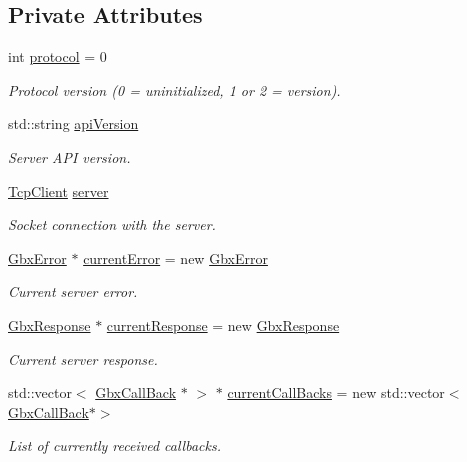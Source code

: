 \subsection*{Private Attributes}
\begin{DoxyCompactItemize}
\item 
int \hyperlink{classGbxRemote_a5ee5c7087085cb6cb2e7bc6135ff0646}{protocol} = 0
\begin{DoxyCompactList}\small\item\em Protocol version (0 = uninitialized, 1 or 2 = version). \end{DoxyCompactList}\item 
std\-::string \hyperlink{classGbxRemote_a81d3c0c70ab7f5e585840e9978ee900e}{api\-Version}
\begin{DoxyCompactList}\small\item\em Server A\-P\-I version. \end{DoxyCompactList}\item 
\hyperlink{classTcpClient}{Tcp\-Client} \hyperlink{classGbxRemote_a0b0b212b945da4266fb645affdac81cb}{server}
\begin{DoxyCompactList}\small\item\em Socket connection with the server. \end{DoxyCompactList}\item 
\hyperlink{structGbxError}{Gbx\-Error} $\ast$ \hyperlink{classGbxRemote_ae5d44c3729140c1eba5e850cb5e5e7bd}{current\-Error} = new \hyperlink{structGbxError}{Gbx\-Error}
\begin{DoxyCompactList}\small\item\em Current server error. \end{DoxyCompactList}\item 
\hyperlink{classGbxResponse}{Gbx\-Response} $\ast$ \hyperlink{classGbxRemote_a3a3a0af1a692a801a33baa292b877dc2}{current\-Response} = new \hyperlink{classGbxResponse}{Gbx\-Response}
\begin{DoxyCompactList}\small\item\em Current server response. \end{DoxyCompactList}\item 
std\-::vector$<$ \hyperlink{classGbxCallBack}{Gbx\-Call\-Back} $\ast$ $>$ $\ast$ \hyperlink{classGbxRemote_a41ed9a6bb1655774d66c9c78b896cda9}{current\-Call\-Backs} = new std\-::vector$<$\hyperlink{classGbxCallBack}{Gbx\-Call\-Back}$\ast$$>$
\begin{DoxyCompactList}\small\item\em List of currently received callbacks. \end{DoxyCompactList}\end{DoxyCompactItemize}


